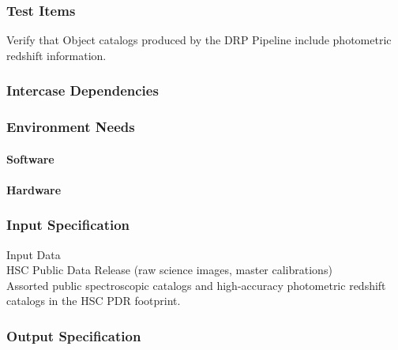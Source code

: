 \subsubsection{Test Items}
Verify that Object catalogs produced by the DRP Pipeline include
photometric redshift information.



\subsubsection{Intercase Dependencies}

\subsubsection{Environment Needs}

\paragraph{Software}

\paragraph{Hardware}

\subsubsection{Input Specification}
Input Data\\
HSC Public Data Release (raw science images, master calibrations)\\
Assorted public spectroscopic catalogs and high-accuracy photometric
redshift catalogs in the HSC PDR footprint.


\subsubsection{Output Specification}

